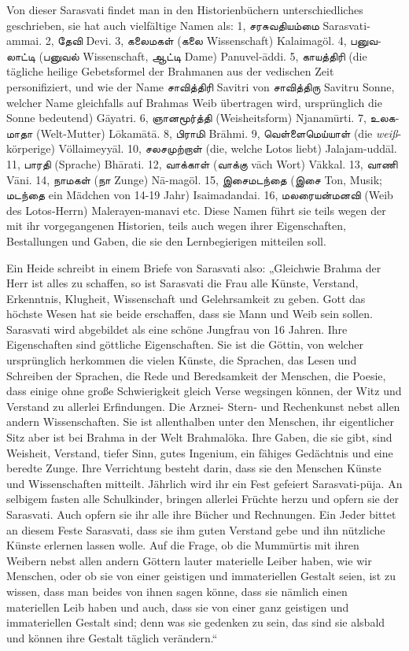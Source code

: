 \documentclass{article}
\newcommand{\TamilText}[1]{\texttamil{#1}}
\newcommand{\tam}[1]{\TamilText{#1}}
\begin{document}
Von dieser Sarasvati findet man in den Historienbüchern unterschiedliches geschrieben, sie hat auch vielfältige Namen als: 1, \tam{சரசுவதியம்மை} Sarasvati-ammai. 2, \tam{தேவி} Devi. 3, \tam{கலைமகள்} (\tam{கலை} Wissenschaft) Kalaimagöl. 4, \tam{பனுவலாட்டி} (\tam{பனுவல்} Wissenschaft, \tam{ஆட்டி} Dame) Panuvel-\={a}ddi. 5, \tam{காயத்திரி} (die tägliche heilige Gebetsformel der Brahmanen aus der vedischen Zeit personifiziert, und wie der Name \tam{சாவித்திரி} Savitri von \tam{சாவித்திரு} Savitru Sonne, welcher Name gleichfalls auf Brahmas Weib übertragen wird, ursprünglich die Sonne bedeutend) G\={a}yatri. 6, \tam{ஞானமூர்த்தி} (Weisheitsform) Njanam\={u}rti. 7, \tam{உலகமாதா} (Welt-Mutter) L\={o}kam\={a}t\={a}. 8, \tam{பிராமி} Br\={a}hmi. 9, \tam{வெள்ளைமெய்யாள்} (die \emph{weiß}-körperige) Völlaimeyy\={a}l. 10, \tam{சலசமுற்றாள்} (die, welche Lotos liebt) Jalajam-udd\={a}l. 11, \tam{பாரதி} (Sprache) Bh\={a}rati. 12, \tam{வாக்காள்} (\tam{வாக்கு} v\={a}ch Wort) V\={a}kkal. 13, \tam{வாணி} V\={a}ni. 14, \tam{நாமகள்} (\tam{நா} Zunge) N\={a}-magöl. 15, \tam{இசைமடந்தை} (\tam{இசை} Ton, Musik; \tam{மடந்தை} ein Mädchen von 14-19 Jahr) Isaimadandai. 16, \tam{மலரையன்மனவி} (Weib des Lotos-Herrn) Malerayen-manavi etc. Diese Namen führt sie teils wegen der mit ihr vorgegangenen Historien, teils auch wegen ihrer Eigenschaften, Bestallungen und Gaben, die sie den Lernbegierigen mitteilen soll.

Ein Heide schreibt in einem Briefe von Sarasvati also: „Gleichwie Brahma der Herr ist alles zu schaffen, so ist Sarasvati die Frau alle Künste, Verstand, Erkenntnis, Klugheit, Wissenschaft und Gelehrsamkeit zu geben. Gott das höchste Wesen hat sie beide erschaffen, dass sie Mann und Weib sein sollen. Sarasvati wird abgebildet als eine schöne Jungfrau von 16 Jahren. Ihre Eigenschaften sind göttliche Eigenschaften. Sie ist die Göttin, von welcher ursprünglich herkommen die vielen Künste, die Sprachen, das Lesen und Schreiben der Sprachen, die Rede und Beredsamkeit der Menschen, die Poesie, dass einige ohne große Schwierigkeit gleich Verse wegsingen können, der Witz und Verstand zu allerlei Erfindungen. Die Arznei- Stern- und Rechenkunst nebst allen andern Wissenschaften. Sie ist allenthalben unter den Menschen, ihr eigentlicher Sitz aber ist bei Brahma in der Welt Brahmal\={o}ka. Ihre Gaben, die sie gibt, sind Weisheit, Verstand, tiefer Sinn, gutes Ingenium, ein fähiges Gedächtnis und eine beredte Zunge. Ihre Verrichtung besteht darin, dass sie den Menschen Künste und Wissenschaften mitteilt. Jährlich wird ihr ein Fest gefeiert Sarasvati-p\={u}ja. An selbigem fasten alle Schulkinder, bringen allerlei Früchte herzu und opfern sie der Sarasvati. Auch opfern sie ihr alle ihre Bücher und Rechnungen. Ein Jeder bittet an diesem Feste Sarasvati, dass sie ihm guten Verstand gebe und ihn nützliche Künste erlernen lassen wolle. Auf die Frage, ob die Mumm\={u}rtis mit ihren Weibern nebst allen andern Göttern lauter materielle Leiber haben, wie wir Menschen, oder ob sie von einer geistigen und immateriellen Gestalt seien, ist zu wissen, dass man beides von ihnen sagen könne, dass sie nämlich einen materiellen Leib haben und auch, dass sie von einer ganz geistigen und immateriellen Gestalt sind; denn was sie gedenken zu sein, das sind sie alsbald und können ihre Gestalt täglich verändern.“
\end{document}
